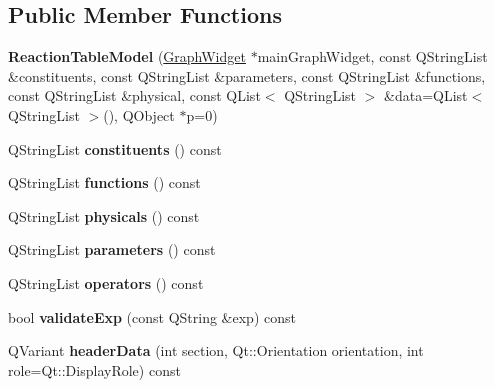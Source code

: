 \subsection*{Public Member Functions}
\begin{DoxyCompactItemize}
\item 
\mbox{\label{class_reaction_table_model_a4f73fa7f2a8632da30b4da4eddb78c6c}} 
{\bfseries Reaction\+Table\+Model} (\hyperlink{class_graph_widget}{Graph\+Widget} $\ast$main\+Graph\+Widget, const Q\+String\+List \&constituents, const Q\+String\+List \&parameters, const Q\+String\+List \&functions, const Q\+String\+List \&physical, const Q\+List$<$ Q\+String\+List $>$ \&data=Q\+List$<$ Q\+String\+List $>$(), Q\+Object $\ast$p=0)
\item 
\mbox{\label{class_reaction_table_model_acfc612b2b1106c12b001c5485a90a4ec}} 
Q\+String\+List {\bfseries constituents} () const
\item 
\mbox{\label{class_reaction_table_model_ad33eea5a65509b066b2cbfa6c4c4a328}} 
Q\+String\+List {\bfseries functions} () const
\item 
\mbox{\label{class_reaction_table_model_a809ac6d2c272ae8d91e6f87e8d0df8f7}} 
Q\+String\+List {\bfseries physicals} () const
\item 
\mbox{\label{class_reaction_table_model_ab84817f8b955eeb973e5e328e4764a3d}} 
Q\+String\+List {\bfseries parameters} () const
\item 
\mbox{\label{class_reaction_table_model_a8fae39999c584226ea5e64969f082c05}} 
Q\+String\+List {\bfseries operators} () const
\item 
\mbox{\label{class_reaction_table_model_abffd5d675ae33097be1f46c98ffe08ce}} 
bool {\bfseries validate\+Exp} (const Q\+String \&exp) const
\item 
\mbox{\label{class_reaction_table_model_a0fa1e50e642cc6ab9d84fde9db20c03d}} 
Q\+Variant {\bfseries header\+Data} (int section, Qt\+::\+Orientation orientation, int role=Qt\+::\+Display\+Role) const

\end{DoxyCompactItemize}
